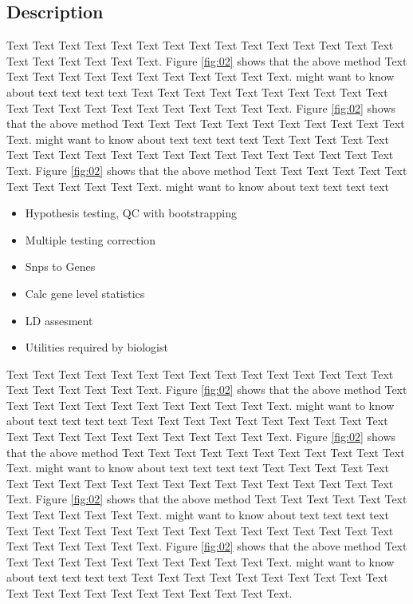\documentclass{bioinfo}
\begin{document}
\begin{methods}
\section{Description}

Text Text Text Text Text Text  Text Text Text Text Text Text Text Text Text  Text Text Text Text Text Text. Figure \ref{fig:02} shows that the above method  Text Text Text Text  Text Text Text Text Text Text  Text Text.  \citealp{Boffelli03} might want to know about  text text text text
Text Text Text Text Text Text  Text Text Text Text Text Text Text Text Text  Text Text Text Text Text Text. Figure \ref{fig:02} shows that the above method  Text Text Text Text  Text Text Text Text Text Text  Text Text.  \citealp{Boffelli03} might want to know about  text text text text
Text Text Text Text Text Text  Text Text Text Text Text Text Text Text Text  Text Text Text Text Text Text. Figure \ref{fig:02} shows that the above method  Text Text Text Text  Text Text Text Text Text Text  Text Text.  \citealp{Boffelli03} might want to know about  text text text text

\begin{itemize}
\item Hypothesis testing, QC with bootstrapping
\item Multiple testing correction
\item Snps to Genes
\item Calc gene level statistics
\item LD assesment
\item Utilities required by biologist
\end{itemize}



Text Text Text Text Text Text  Text Text Text Text Text Text Text Text Text  Text Text Text Text Text Text. Figure \ref{fig:02} shows that the above method  Text Text Text Text  Text Text Text Text Text Text  Text Text.  \citealp{Boffelli03} might want to know about  text text text text
Text Text Text Text Text Text  Text Text Text Text Text Text Text Text Text  Text Text Text Text Text Text. Figure \ref{fig:02} shows that the above method  Text Text Text Text  Text Text Text Text Text Text  Text Text.  \citealp{Boffelli03} might want to know about  text text text text
Text Text Text Text Text Text  Text Text Text Text Text Text Text Text Text  Text Text Text Text Text Text. Figure \ref{fig:02} shows that the above method  Text Text Text Text  Text Text Text Text Text Text  Text Text.  \citealp{Boffelli03} might want to know about  text text text text
Text Text Text Text Text Text  Text Text Text Text Text Text Text Text Text  Text Text Text Text Text Text. Figure \ref{fig:02} shows that the above method  Text Text Text Text  Text Text Text Text Text Text  Text Text.  \citealp{Boffelli03} might want to know about  text text text text
Text Text Text Text Text Text  Text Text Text Text Text Text Text Text Text  Text Text Text Text Text Text.



\end{methods}
\end{document}
